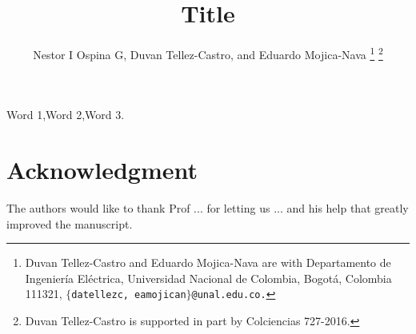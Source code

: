 \documentclass[letterpaper,10pt,conference,draftcls,onecolumn]{ieeeconf} %
\theoremstyle{plain}
\begin{document}
\title{\LARGE \bf  Title}

\author{Nestor I Ospina G, Duvan Tellez-Castro,
        and Eduardo Mojica-Nava
\thanks{Duvan Tellez-Castro and Eduardo Mojica-Nava are with Departamento de Ingenier\'ia El\'ectrica, Universidad Nacional de Colombia, Bogot\'a, Colombia 111321, $\{$\texttt{datellezc, eamojican$\}$@unal.edu.co.}}        
\thanks{Duvan Tellez-Castro is supported in part by Colciencias 727-2016.}
}        
 
\maketitle

\begin{abstract}

 
 
\end{abstract}
\begin{keywords}
	Word 1,Word 2,Word 3. %
\end{keywords}



 
 
 
\section*{Acknowledgment}
The authors would like to thank Prof ... for  letting us ... and his help that greatly improved the manuscript.
%
\end{document}
